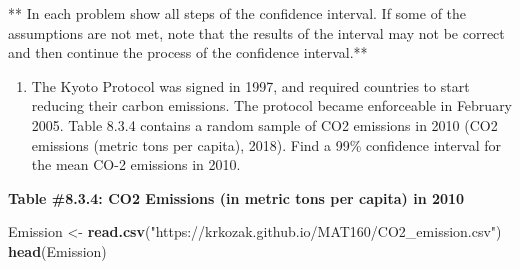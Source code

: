 \documentclass[
]{book}
\newenvironment{Shaded}{\begin{snugshade}}{\end{snugshade}}
\newcommand{\KeywordTok}[1]{\textcolor[rgb]{0.13,0.29,0.53}{\textbf{#1}}}
\newcommand{\NormalTok}[1]{#1}
\newcommand{\StringTok}[1]{\textcolor[rgb]{0.31,0.60,0.02}{#1}}
\providecommand{\tightlist}{%
  \setlength{\itemsep}{0pt}\setlength{\parskip}{0pt}}
\begin{document}
** In each problem show all steps of the confidence interval. If some of the assumptions are not met, note that the results of the interval may not be correct and then continue the process of the confidence interval.**

\begin{enumerate}
\def\labelenumi{\arabic{enumi}.}
\tightlist
\item
  The Kyoto Protocol was signed in 1997, and required countries to start reducing their carbon emissions. The protocol became enforceable in February 2005. Table 8.3.4 contains a random sample of CO2 emissions in 2010 (CO2 emissions (metric tons per capita), 2018). Find a 99\% confidence interval for the mean CO-2 emissions in 2010.
\end{enumerate}

\textbf{Table \#8.3.4: CO2 Emissions (in metric tons per capita) in 2010}

\begin{Shaded}
\begin{Highlighting}[]
\NormalTok{Emission <-}\StringTok{ }\KeywordTok{read.csv}\NormalTok{(}\StringTok{"https://krkozak.github.io/MAT160/CO2_emission.csv"}\NormalTok{)}
\KeywordTok{head}\NormalTok{(Emission)}
\end{Highlighting}
\end{Shaded}
\end{document}
